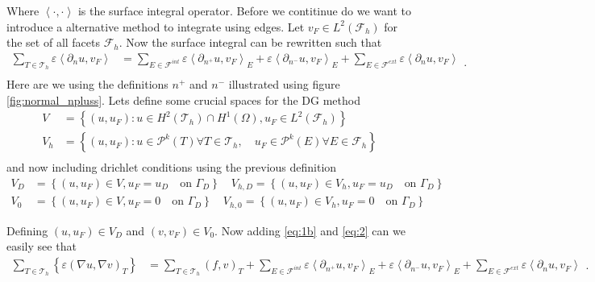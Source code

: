 Where $\left< \cdot ,\cdot  \right>$ is the surface integral operator. Before we contitinue do we want to introduce a
alternative method to integrate using edges. Let $v_{F} \in  L^2\left( \mathcal{F}_{h}  \right)$ for the set of all
facets $\mathcal{F} _{h}$. Now the surface integral can be rewritten such that
\begin{equation}
\label{eq:2}
    \begin{split}
 \sum_{T \in
\mathcal{T} _{h}}^{} \varepsilon  \left<\partial _{n} u , v_{F} \right>
&= \sum_{E \in \mathcal{F} ^{int}}^{}  \varepsilon \left<\partial _{n^{+}} u, v_{F} \right>_{E} + \varepsilon \left<
\partial _{n^{-}} u, v_{F}
\right>_{E} + \sum_{E \in \mathcal{F} ^{ext}}^{} \varepsilon \left<\partial _{n} u, v_{F} \right>   \\
    \end{split}
.\end{equation}
Here are we using the definitions $n^{+}$ and $n^{-}$ illustrated using figure \ref{fig:normal_npluss}.
Lets define some crucial spaces for the DG method \[
    \begin{split}
V &=  \left\{ \left( u, u_{F} \right) : u \in H^2\left( \mathcal{T} _{h} \right) \cap H^{1}\left( \Omega  \right)   ,
u_{F} \in  L^2\left( \mathcal{F} _{h} \right)  \right\} \\
V_{h} &=  \left\{ \left( u,u_{F} \right) : u \in  \mathcal{P} ^{k} \left( T \right) \forall T \in  \mathcal{T} _{h} , \quad
u_{F} \in  \mathcal{P} ^{k}\left( E \right)  \forall E  \in \mathcal{F} _{h}   \right\} \\
    \end{split}
\]
and now including drichlet conditions using the previous definition \[
\begin{split}
    V_{D} & = \left\{ \left( u,u_{F} \right) \in V , u_{F} = u_{D} \quad  \text{on } \Gamma _{D}  \right\} \quad
    V_{h,D}  = \left\{ \left( u, u_{F} \right) \in  V_{h}, u_{F} = u_{D} \quad  \text{on } \Gamma _{D}  \right\} \\
    V_{0} & = \left\{ \left( u,u_{F} \right) \in V , u_{F} = 0 \quad  \text{on } \Gamma _{D}  \right\} \quad
    V_{h,0}  = \left\{ \left( u, u_{F} \right) \in  V_{h}, u_{F} = 0 \quad  \text{on } \Gamma _{D}  \right\}
\end{split}
\]

Defining  $\left( u, u_{F} \right) \in  V_{D} $ and $\left( v, v_{F} \right) \in  V_{0} $.
Now adding \eqref{eq:1b} and \eqref{eq:2} can we easily see that
\begin{equation}
    \label{eq:3a}
    \begin{split}
   \sum_{T \in \mathcal{T} _{h}}^{}
     \left\{ \varepsilon\left( \nabla u, \nabla v \right) _{T}  \right\}
     & = \sum_{T \in \mathcal{T} _{h}}^{}  \left( f,v \right)_{T} +\sum_{E \in \mathcal{F} ^{int}}^{}  \varepsilon \left<\partial _{n^{+}} u, v_{F} \right>_{E} + \varepsilon \left<
\partial _{n^{-}} u, v_{F} \right>_{E} + \sum_{E \in \mathcal{F} ^{ext}}^{} \varepsilon \left<\partial _{n} u, v_{F} \right>
    \end{split}
.\end{equation}

